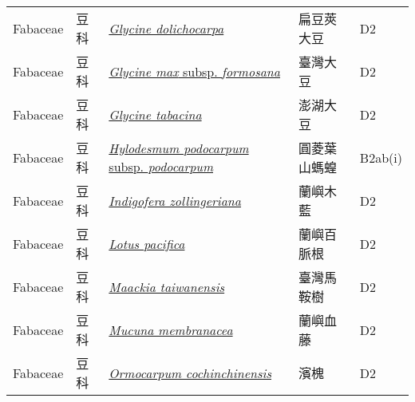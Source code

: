 {\begin{longtable}{L{2.5cm}L{2cm}L{5cm}L{2.5cm}L{3cm}}
    Fabaceae & 豆科 & \href{http://www.theplantlist.org/tpl1.1/search?q=Glycine+dolichocarpa}{\textit{Glycine dolichocarpa} } & 扁豆莢大豆 & D2    \\
    Fabaceae & 豆科 & \href{http://www.theplantlist.org/tpl1.1/search?q=Glycine+max+subsp.+formosana}{\textit{Glycine max} subsp. \textit{formosana} } & 臺灣大豆 & D2    \\
    Fabaceae & 豆科 & \href{http://www.theplantlist.org/tpl1.1/search?q=Glycine+tabacina}{\textit{Glycine tabacina} } & 澎湖大豆 & D2    \\
    Fabaceae & 豆科 & \href{http://www.theplantlist.org/tpl1.1/search?q=Hylodesmum+podocarpum+subsp.+podocarpum}{\textit{Hylodesmum podocarpum} subsp. \textit{podocarpum} } & 圓菱葉山螞蝗 & B2ab(i)    \\
    Fabaceae & 豆科 & \href{http://www.theplantlist.org/tpl1.1/search?q=Indigofera+zollingeriana}{\textit{Indigofera zollingeriana} } & 蘭嶼木藍 & D2    \\
    Fabaceae & 豆科 & \href{http://www.theplantlist.org/tpl1.1/search?q=Lotus+pacifica}{\textit{Lotus pacifica} } & 蘭嶼百脈根 & D2    \\
    Fabaceae & 豆科 & \href{http://www.theplantlist.org/tpl1.1/search?q=Maackia+taiwanensis}{\textit{Maackia taiwanensis} } & 臺灣馬鞍樹 & D2    \\
    Fabaceae & 豆科 & \href{http://www.theplantlist.org/tpl1.1/search?q=Mucuna+membranacea}{\textit{Mucuna membranacea} } & 蘭嶼血藤 & D2    \\
    Fabaceae & 豆科 & \href{http://www.theplantlist.org/tpl1.1/search?q=Ormocarpum+cochinchinensis}{\textit{Ormocarpum cochinchinensis} } & 濱槐 & D2    \\

\end{longtable}}
